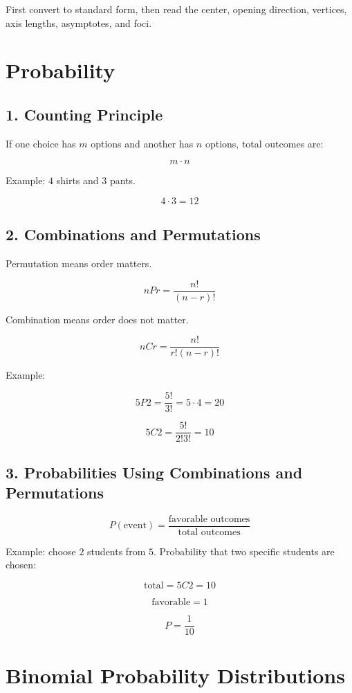 \documentclass[11pt]{article}
\begin{document}
First convert to standard form, then read the center, opening direction, vertices, axis lengths, asymptotes, and foci.

\section*{Probability}

\subsection*{1. Counting Principle}

If one choice has \(m\) options and another has \(n\) options, total outcomes are:

\[
m\cdot n
\]

Example: \(4\) shirts and \(3\) pants.

\[
4\cdot3=12
\]

\subsection*{2. Combinations and Permutations}

Permutation means order matters.

\[
nP r=\frac{n!}{(n-r)!}
\]

Combination means order does not matter.

\[
nC r=\frac{n!}{r!(n-r)!}
\]

Example:

\[
5P2=\frac{5!}{3!}=5\cdot4=20
\]

\[
5C2=\frac{5!}{2!3!}=10
\]

\subsection*{3. Probabilities Using Combinations and Permutations}

\[
P(\text{event})=
\frac{\text{favorable outcomes}}{\text{total outcomes}}
\]

Example: choose \(2\) students from \(5\). Probability that two specific students are chosen:

\[
\text{total}=5C2=10
\]

\[
\text{favorable}=1
\]

\[
P=\frac{1}{10}
\]

\section*{Binomial Probability Distributions}
\end{document}
